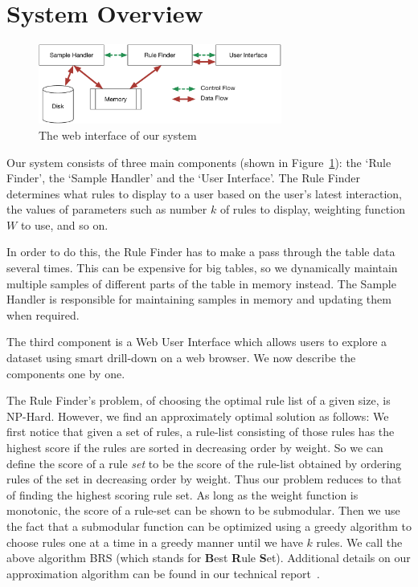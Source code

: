 
\section{System Overview}\label{sec:system}

\begin{figure}
\vspace{-5pt}
\centering
\includegraphics[width=80mm]{graphs/arch.pdf}
\vspace{-20pt}
\caption{The web interface of our system \label{fig:system}}
\vspace{-15pt}
\end{figure}

Our system consists of three main components (shown in Figure~\ref{fig:system}): the `Rule Finder', the `Sample Handler' and the `User Interface'. The Rule Finder determines what rules to display to a user based on the user's latest interaction, the values of parameters such as number $k$ of rules to display, weighting function $W$ to use, and so on. 

In order to do this, the Rule Finder has to make a pass through the table data several times. This can be expensive for big tables, so we dynamically maintain multiple samples of different parts of the table in memory instead. The Sample Handler is responsible for maintaining samples in memory and updating them when required. 

The third component is a Web User Interface which allows users to explore a dataset using smart drill-down on a web browser. We now describe the components one by one.

The Rule Finder's problem, of choosing the optimal rule list of a given size, is NP-Hard. However, we find an approximately optimal solution as follows: We first notice that given a set of rules, a rule-list consisting of those rules has the highest score if the rules are sorted in decreasing order by weight. So we can define the score of a rule {\em set} to be the score of the rule-list obtained by ordering rules of the set in decreasing order by weight. Thus our problem reduces to that of finding the highest scoring rule set. As long as the weight function is monotonic, the score of a rule-set can be shown to be submodular. Then we use the fact that a submodular function can be optimized using a greedy algorithm to choose rules one at a time in a greedy manner until we have $k$ rules. We call the above algorithm BRS (which stands for {\bf B}est {\bf R}ule {\bf S}et). Additional details on our approximation algorithm can be found in our technical report~\cite{tr}. 

